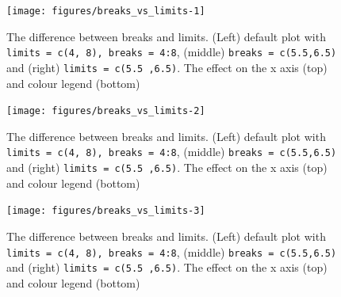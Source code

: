 \begin{figure}
\texttt{[image: figures/breaks\_vs\_limits-1]} \caption{The difference between breaks and limits. (Left) default plot with \texttt{limits = c(4, 8), breaks = 4:8}, (middle) \texttt{breaks = c(5.5,6.5)} and (right) \texttt{limits = c(5.5 ,6.5)}. The effect on the x axis (top) and colour legend (bottom)\label{fig:breaks_vs_limits1}}
\end{figure}

\begin{Shaded}
\begin{Highlighting}[]
\StringTok{ }\NormalTok{(} \NormalTok{(}\NormalTok{, }\NormalTok{))}
\end{Highlighting}
\end{Shaded}

\begin{figure}
\texttt{[image: figures/breaks\_vs\_limits-2]} \caption{The difference between breaks and limits. (Left) default plot with \texttt{limits = c(4, 8), breaks = 4:8}, (middle) \texttt{breaks = c(5.5,6.5)} and (right) \texttt{limits = c(5.5 ,6.5)}. The effect on the x axis (top) and colour legend (bottom)\label{fig:breaks_vs_limits2}}
\end{figure}

\begin{Shaded}
\begin{Highlighting}[]
\StringTok{ }\NormalTok{(} \NormalTok{(}\NormalTok{, }\NormalTok{))}
\end{Highlighting}
\end{Shaded}

\begin{figure}
\texttt{[image: figures/breaks\_vs\_limits-3]} \caption{The difference between breaks and limits. (Left) default plot with \texttt{limits = c(4, 8), breaks = 4:8}, (middle) \texttt{breaks = c(5.5,6.5)} and (right) \texttt{limits = c(5.5 ,6.5)}. The effect on the x axis (top) and colour legend (bottom)\label{fig:breaks_vs_limits3}}
\end{figure}

\begin{Shaded}
\begin{Highlighting}[]
\StringTok{ }  
\end{Highlighting}
\end{Shaded}

